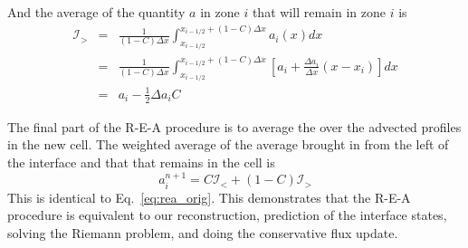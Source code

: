 \documentclass[11pt]{article}
\begin{document}
And the average of the quantity $a$ in zone $i$ that will remain in zone $i$
is
\begin{eqnarray}
\mathcal{I}_> &=& \frac{1}{(1-C) \Delta x} 
   \int_{x_{i-1/2}}^{x_{i-1/2} + (1-C) \Delta x} a_{i}(x) dx \\
%
 &=& \frac{1}{(1-C) \Delta x} 
   \int_{x_{i-1/2}}^{x_{i-1/2} + (1-C)\Delta x} 
        \left [ a_{i} + \frac{\Delta a_{i}}{\Delta x} (x - x_{i} ) \right ] dx  \\
 &=& a_{i} - \frac{1}{2} \Delta a_{i} C
\end{eqnarray}

The final part of the R-E-A procedure is to average the over the 
advected profiles in the new cell.  The weighted average of the
average brought in from the left of the interface and that that remains
in the cell is
\begin{equation}
a_i^{n+1} = C \mathcal{I}_< + (1 - C) \mathcal{I}_> 
\end{equation}          
This is identical to Eq.~\ref{eq:rea_orig}.  This demonstrates that the
R-E-A procedure is equivalent to our reconstruction, prediction of the
interface states, solving the Riemann problem, and doing the 
conservative flux update.
\end{document}
